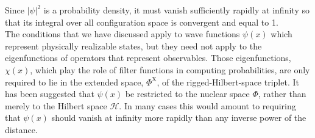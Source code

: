 Since $|\psi|^2$ is a probability density, it must vanish sufficiently rapidly at infinity so that its integral over all configuration space is convergent and equal to 1. \\
The conditions that we have discussed apply to wave functions $\psi(x)$ which represent physically realizable states, but they need not apply to the eigenfunctions of operators that represent observables. Those eigenfunctions, $\chi(x)$, which play the role of filter functions in computing probabilities, are only required to lie in the extended space, $\Phi^{\mathrm{X}}$, of the rigged-Hilbert-space triplet. It has been suggested that $\psi(x)$ be restricted to the nuclear space $\Phi$, rather than merely to the Hilbert space $\mathcal{H}$. In many cases this would amount to requiring that $\psi(x)$ should vanish at infinity more rapidly than any inverse power of the distance. 

